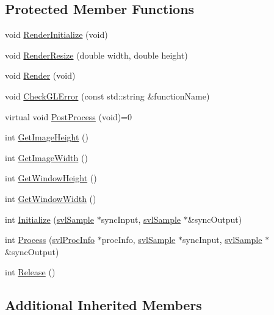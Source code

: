 \subsection*{Protected Member Functions}
\begin{DoxyCompactItemize}
\item 
void \hyperlink{classsvl_filter_image_open_g_l_aa966bc6dbbc3f03b2d17c19d7645f60e}{Render\+Initialize} (void)
\item 
void \hyperlink{classsvl_filter_image_open_g_l_aedadec97f214083356d1cffdbeffedc5}{Render\+Resize} (double width, double height)
\item 
void \hyperlink{classsvl_filter_image_open_g_l_a197bed731e8abb3f10814e2604e8a1ce}{Render} (void)
\item 
void \hyperlink{classsvl_filter_image_open_g_l_a9d0318930ecd6989962f7886ecdd9b76}{Check\+G\+L\+Error} (const std\+::string \&function\+Name)
\item 
virtual void \hyperlink{classsvl_filter_image_open_g_l_ab3a0a1412515c7eb2e9237d529409f2d}{Post\+Process} (void)=0
\item 
int \hyperlink{classsvl_filter_image_open_g_l_a89f8dd6d8f06e092dd938ca055ea8fba}{Get\+Image\+Height} ()
\item 
int \hyperlink{classsvl_filter_image_open_g_l_ac5004073dc9d75c0b24c6c7c4de24f5a}{Get\+Image\+Width} ()
\item 
int \hyperlink{classsvl_filter_image_open_g_l_ab26c807e12ac0976914d283e87048a17}{Get\+Window\+Height} ()
\item 
int \hyperlink{classsvl_filter_image_open_g_l_abdde1baa9b8c4792cc0505962b49b2fa}{Get\+Window\+Width} ()
\item 
int \hyperlink{classsvl_filter_image_open_g_l_a51d341db058fc64c36ab57f71aa8efb3}{Initialize} (\hyperlink{classsvl_sample}{svl\+Sample} $\ast$sync\+Input, \hyperlink{classsvl_sample}{svl\+Sample} $\ast$\&sync\+Output)
\item 
int \hyperlink{classsvl_filter_image_open_g_l_aaa30347e6f0498b314bc33d55bc98e44}{Process} (\hyperlink{structsvl_proc_info}{svl\+Proc\+Info} $\ast$proc\+Info, \hyperlink{classsvl_sample}{svl\+Sample} $\ast$sync\+Input, \hyperlink{classsvl_sample}{svl\+Sample} $\ast$\&sync\+Output)
\item 
int \hyperlink{classsvl_filter_image_open_g_l_a8d5472a0943b0c1b027becfcee030f12}{Release} ()
\end{DoxyCompactItemize}
\subsection*{Additional Inherited Members}



